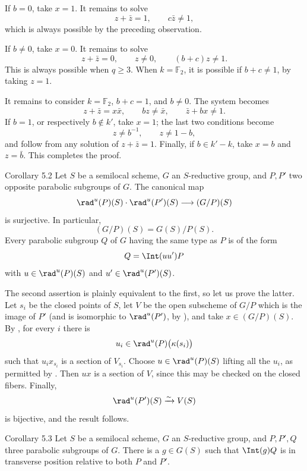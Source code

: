 If \(b=0\), take \(x=1\).  It remains to solve
\[
 z+\bar z=1,\qquad c\bar z\ne1,
\]
which is always possible by the preceding observation.

If \(b\ne0\), take \(x=0\).  It remains to solve
\[
 z+\bar z=0,\qquad z\ne0,\qquad (b+c)z\ne1.
\]
This is always possible when \(q\geq3\).  When \(k=\mathbb F_2\), it
is possible if \(b+c\ne1\), by taking \(z=1\).

It remains to consider \(k=\mathbb F_2\), \(b+c=1\), and \(b\ne0\).
The system becomes
\[
 z+\bar z=x\bar x,\qquad bz\ne\bar x,\qquad
 \bar z+bx\ne1.
\]
If \(b=1\), or respectively \(b\notin k'\), take \(x=1\); the last two
conditions become
\[
 z\ne b^{-1},\qquad z\ne1-b,
\]
and follow from any solution of \(z+\bar z=1\).  Finally, if
\(b\in k'-k\), take \(x=b\) and \(z=\bar b\).  This completes the
proof.
\SGAQED


\begin{sgastatement}{Corollary 5.2}
Let \(S\) be a semilocal scheme, \(G\) an \(S\)-reductive group, and
\(P,P'\) two opposite parabolic subgroups of \(G\).  The canonical map
\[
 \rad^u(P)(S)\cdot\rad^u(P')(S)\longrightarrow(G/P)(S)
\]
is surjective.  In particular,
\[
 (G/P)(S)=G(S)/P(S).
\]
Every parabolic subgroup \(Q\) of \(G\) having the same type as \(P\)
is of the form
\[
 Q=\Int(uu')P
\]
with \(u\in\rad^u(P)(S)\) and \(u'\in\rad^u(P')(S)\).
\end{sgastatement}

The second assertion is plainly equivalent to the first, so let us
prove the latter.  Let \(s_i\) be the closed points of \(S\), let
\(V\) be the open subscheme of \(G/P\) which is the image of \(P'\)
\textup{(and is isomorphic to \(\rad^u(P')\), by )}, and take
\(x\in(G/P)(S)\).  By , for every \(i\) there is
\[
 u_i\in\rad^u(P)\bigl(\kappa(s_i)\bigr)
\]
such that \(u_ix_{s_i}\) is a section of \(V_{s_i}\).  Choose
\(u\in\rad^u(P)(S)\) lifting all the \(u_i\), as permitted by .
Then \(ux\) is a section of \(V\), since this may be checked on the
closed fibers.  Finally,
\[
 \rad^u(P')(S)\xrightarrow{\sim}V(S)
\]
is bijective, and the result follows.

\begin{sgastatement}{Corollary 5.3}
Let \(S\) be a semilocal scheme, \(G\) an \(S\)-reductive group, and
\(P,P',Q\) three parabolic subgroups of \(G\).  There is a
\(g\in G(S)\) such that \(\Int(g)Q\) is in transverse position
relative to both \(P\) and \(P'\).
\end{sgastatement}

